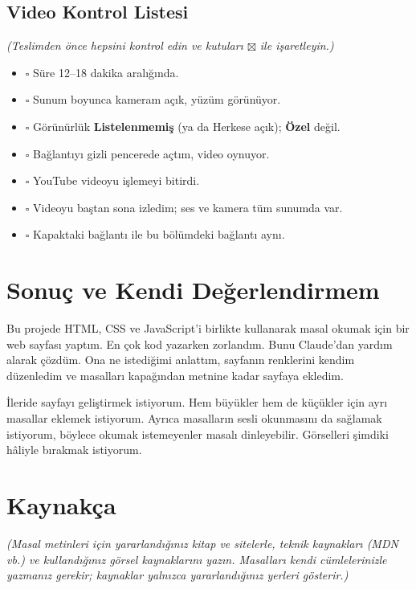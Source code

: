 \documentclass[12pt,a4paper]{article}
\newcommand{\aciklama}[1]{{\color{gray}\itshape (#1)}}
\begin{document}
\subsection{Video Kontrol Listesi}
\aciklama{Teslimden önce hepsini kontrol edin ve kutuları $\boxtimes$ ile işaretleyin.}
\begin{itemize}[label={}]
  \item $\square$ Süre 12--18 dakika aralığında.
  \item $\square$ Sunum boyunca kameram açık, yüzüm görünüyor.
  \item $\square$ Görünürlük \textbf{Listelenmemiş} (ya da Herkese açık); \textbf{Özel} değil.
  \item $\square$ Bağlantıyı gizli pencerede açtım, video oynuyor.
  \item $\square$ YouTube videoyu işlemeyi bitirdi.
  \item $\square$ Videoyu baştan sona izledim; ses ve kamera tüm sunumda var.
  \item $\square$ Kapaktaki bağlantı ile bu bölümdeki bağlantı aynı.
\end{itemize}

\section{Sonuç ve Kendi Değerlendirmem}
Bu projede HTML, CSS ve JavaScript'i birlikte kullanarak masal okumak için bir web sayfası yaptım. En çok kod yazarken zorlandım. Bunu Claude'dan yardım alarak çözdüm. Ona ne istediğimi anlattım, sayfanın renklerini kendim düzenledim ve masalları kapağından metnine kadar sayfaya ekledim.

İleride sayfayı geliştirmek istiyorum. Hem büyükler hem de küçükler için ayrı masallar eklemek istiyorum. Ayrıca masalların sesli okunmasını da sağlamak istiyorum, böylece okumak istemeyenler masalı dinleyebilir. Görselleri şimdiki hâliyle bırakmak istiyorum.

\section{Kaynakça}
\aciklama{Masal metinleri için yararlandığınız kitap ve sitelerle, teknik kaynakları
(MDN vb.) ve kullandığınız görsel kaynaklarını yazın. Masalları kendi
cümlelerinizle yazmanız gerekir; kaynaklar yalnızca yararlandığınız yerleri
gösterir.}
\end{document}
